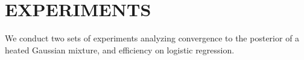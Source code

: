 \documentclass[twoside]{article} \usepackage{aistats2017}
\newtheorem{lemma}{Lemma}
\begin{document}

\section{EXPERIMENTS}\label{sec:experiments}

We conduct two sets of experiments analyzing convergence to the posterior of a
heated Gaussian mixture, and efficiency on logistic regression.
\end{document}
